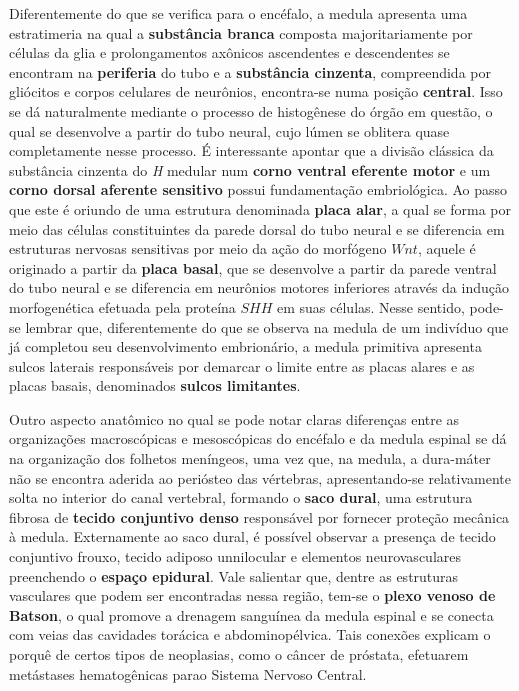 \documentclass[
]{book}
\begin{document}
Diferentemente do que se verifica para o encéfalo, a medula apresenta uma estratimeria na qual a \textbf{substância branca} composta majoritariamente por células da glia e prolongamentos axônicos ascendentes e descendentes se encontram na \textbf{periferia} do tubo e a \textbf{substância cinzenta}, compreendida por gliócitos e corpos celulares de neurônios, encontra-se numa posição \textbf{central}. Isso se dá naturalmente mediante o processo de histogênese do órgão em questão, o qual se desenvolve a partir do tubo neural, cujo lúmen se oblitera quase completamente nesse processo. É interessante apontar que a divisão clássica da substância cinzenta do \emph{H} medular num \textbf{corno ventral eferente motor} e um \textbf{corno dorsal aferente sensitivo} possui fundamentação embriológica. Ao passo que este é oriundo de uma estrutura denominada \textbf{placa alar}, a qual se forma por meio das células constituintes da parede dorsal do tubo neural e se diferencia em estruturas nervosas sensitivas por meio da ação do morfógeno \(Wnt\), aquele é originado a partir da \textbf{placa basal}, que se desenvolve a partir da parede ventral do tubo neural e se diferencia em neurônios motores inferiores através da indução morfogenética efetuada pela proteína \(SHH\) em suas células. Nesse sentido, pode-se lembrar que, diferentemente do que se observa na medula de um indivíduo que já completou seu desenvolvimento embrionário, a medula primitiva apresenta sulcos laterais responsáveis por demarcar o limite entre as placas alares e as placas basais, denominados \textbf{sulcos limitantes}.

Outro aspecto anatômico no qual se pode notar claras diferenças entre as organizações macroscópicas e mesoscópicas do encéfalo e da medula espinal se dá na organização dos folhetos meníngeos, uma vez que, na medula, a dura-máter não se encontra aderida ao periósteo das vértebras, apresentando-se relativamente solta no interior do canal vertebral, formando o \textbf{saco dural}, uma estrutura fibrosa de \textbf{tecido conjuntivo denso} responsável por fornecer proteção mecânica à medula. Externamente ao saco dural, é possível observar a presença de tecido conjuntivo frouxo, tecido adiposo unnilocular e elementos neurovasculares preenchendo o \textbf{espaço epidural}. Vale salientar que, dentre as estruturas vasculares que podem ser encontradas nessa região, tem-se o \textbf{plexo venoso de Batson}, o qual promove a drenagem sanguínea da medula espinal e se conecta com veias das cavidades torácica e abdominopélvica. Tais conexões explicam o porquê de certos tipos de neoplasias, como o câncer de próstata, efetuarem metástases hematogênicas parao Sistema Nervoso Central.
\end{document}
